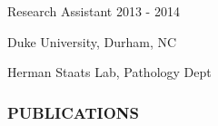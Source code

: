 \documentclass[12pt,english]{article}
\begin{document}
\hspace{1.0em} Research Assistant
\hfill
2013 - 2014
\vspace{-0.5ex}\par
\hspace{2.0em} Duke University, Durham, NC
\vspace{-0.5ex}\par
\hspace{2.0em} Herman Staats Lab, Pathology Dept

\vspace{0.5em}\par

\subsubsection*{PUBLICATIONS}
\vspace{-0.5ex}
\end{document}
